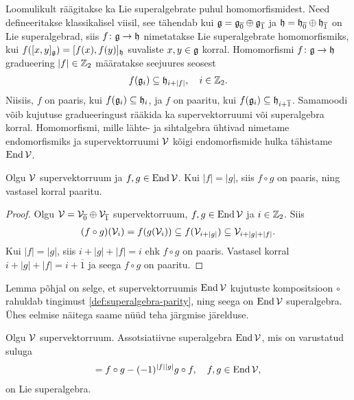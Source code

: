 Loomulikult räägitakse ka Lie superalgebrate puhul homomorfismidest. Need
defineeritakse klassikalisel viisil, see tähendab kui
$\mathfrak{g} = \mathfrak{g}_{\overline{0}} \oplus \mathfrak{g}_{\overline{1}}$ ja
$\mathfrak{h} = \mathfrak{h}_{\overline{0}} \oplus \mathfrak{h}_{\overline{1}}$
on Lie superalgebrad, siis $f \colon \mathfrak{g} \to \mathfrak{h}$ nimetatakse
Lie superalgebrate homomorfismiks, kui
$f([x, y]_{\mathfrak{g}}) = [f(x), f(y)]_{\mathfrak{h}}$
suvaliste $x, y \in \mathfrak{g}$ korral. Homomorfismi $f \colon \mathfrak{g} \to \mathfrak{h}$
gradueering $|f| \in \mathbb{Z}_2$ määratakse seejuures seosest
\begin{align*}
    f(\mathfrak{g}_i) \subseteq \mathfrak{h}_{i + |f|}, \quad i \in \mathbb{Z}_2.
\end{align*}
Niisiis, $f$ on paaris, kui $f(\mathfrak{g}_i) \subseteq \mathfrak{h}_i$, ja $f$ on paaritu,
kui $f(\mathfrak{g}_i) \subseteq \mathfrak{h}_{i+\overline{1}}$. Samamoodi võib kujutuse
gradueeringust rääkida ka supervektorruumi või superalgebra korral.
Homomorfismi, mille lähte- ja sihtalgebra ühtivad nimetame endomorfismiks
ja supervektorruumi $\mathcal{V}$ kõigi endomorfismide hulka tähistame $\operatorname{End} \mathcal{V}$.

\begin{lemma}
    Olgu $\mathcal{V}$ supervektorruum ja $f, g \in \operatorname{End} \mathcal{V}$. Kui $|f| = |g|$,
    siis $f \circ g$ on paaris, ning vastasel korral paaritu.
\end{lemma}

\begin{proof}
    Olgu $\mathcal{V} = \mathcal{V}_{\overline{0}} \oplus \mathcal{V}_{\overline{1}}$ supervektorruum,
    $f, g \in \operatorname{End} \mathcal{V}$ ja $i \in \mathbb{Z}_2$. Siis
    \begin{align*}
        (f \circ g)(\mathcal{V}_i) = f(g(\mathcal{V}_i)) \subseteq
        f(\mathcal{V}_{i + |g|}) \subseteq \mathcal{V}_{i + |g| + |f|}.
    \end{align*}
    Kui $|f| = |g|$, siis $i + |g| + |f| = i$ ehk $f \circ g$ on paaris.
    Vastasel korral $i + |g| + |f| = i + \overline{1}$ ja seega
    $f \circ g$ on paaritu.
\end{proof}

Lemma põhjal on selge, et supervektorruumis $\operatorname{End} \mathcal{V}$ kujutuste
kompositsioon $\circ$ rahuldab tingimust \eqref{def:superalgebra-parity},
ning seega on $\operatorname{End} \mathcal{V}$ superalgebra. Ühes eelmise näitega saame nüüd
teha järgmise järelduse.

\begin{jar}
    Olgu $\mathcal{V}$ supervektorruum. Assotsiatiivne superalgebra $\operatorname{End} \mathcal{V}$, mis on
    varustatud suluga
    \begin{align*}
        [f, g] = f \circ g - (-1)^{|f||g|} g \circ f, \quad f, g \in \End \V,
    \end{align*}
    on Lie superalgebra.
\end{jar}

